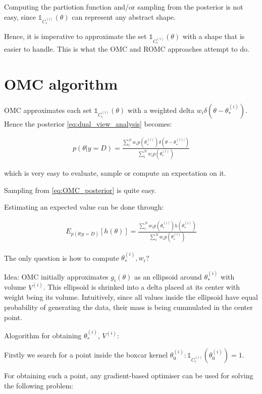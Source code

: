 \documentclass{article}
\begin{document}
Computing the partiotion function and/or sampling from the posterior is not easy, since $\mathbb{1}_{C_\epsilon^{(i)}}(\theta)$ can represent any abstract shape.

Hence, it is imperative to approximate the set $\mathbb{1}_{C_\epsilon^{(i)}}(\theta)$ with a shape that is easier to handle. This is what the OMC and ROMC approaches attempt to do.

\section{OMC algorithm}

OMC approximates each set $\mathbb{1}_{C_\epsilon^{(i)}}(\theta)$ with a weighted delta $w_i\delta(\theta - \theta_*^{(i)})$. Hence the posterior \ref{eq:dual_view_analysis} becomes:

\begin{gather} \label{eq:OMC_posterior}
  p(\theta|y=D) = \frac{\sum_i^N w_i p(\theta_*^{(i)})\delta(\theta - \theta_*^{(i))})}{\sum_i^N w_i p(\theta_*^{(i)})}
\end{gather}

which is very easy to evaluate, sample or compute an expectation on it.

Sampling from \ref{eq:OMC_posterior} is quite easy.

Estimating an expected value can be done through:

\begin{gather} \label{eq:OMC_expectation}
  E_{p(\theta|y=D)}[h(\theta)] = \frac{\sum_i^N w_i p(\theta_*^{(i)})h(\theta_*^{(i)})}{\sum_i^N w_i p(\theta_*^{(i)})}
\end{gather}


The only question is how to compute $\theta_*^{(i)}, w_i$?

Idea: OMC initially approximates $g_i(\theta)$ as an ellipsoid around $\theta_*^{(i)}$ with volume $V^{(i)}$. This ellipsoid is shrinked into a delta placed at its center with weight being its volume. Intuitively, since all values inside the ellipsoid have equal probability of generating the data, their mass is being cummulated in the center point.

Alogorithm for obtaining $\theta_*^{(i)}$, $V^{(i)}$:

Firstly we search for a point inside the boxcar kernel $\theta_0^{(i)}: \mathbb{1}_{C_\epsilon^{(i)}}(\theta_0^{(i)}) = 1$. 

For obtaining such a point, any gradient-based optimiser can be used for solving the following problem:
 
\end{document}
